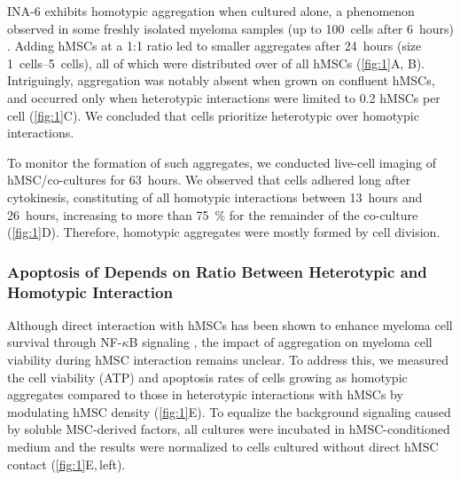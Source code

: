 INA-6 exhibits homotypic aggregation when cultured alone, a phenomenon observed
in some freshly isolated myeloma samples (up to \SI{100}{cells} after
\SI{6}{hours})
\cite{kawanoHomotypicCellAggregations1991,okunoVitroGrowthPattern1991}. Adding
hMSCs at a 1:1 ratio led to smaller aggregates after \SI{24}{hours} (size
\SIrange{1}{5}{cells}), all of which were distributed over
 of all hMSCs (\autoref{fig:1}A, B). Intriguingly,
\INA aggregation was notably absent when grown on confluent hMSCs, and occurred
only when heterotypic interactions were limited to 0.2 hMSCs per \INA cell
(\autoref{fig:1}C). We concluded that \INA cells prioritize heterotypic over
homotypic interactions.

To monitor the formation of such aggregates, we conducted live-cell imaging of
hMSC/\INA co-cultures for \SI{63}{hours}. We observed that \INA cells adhered
long after cytokinesis, constituting  of all
homotypic interactions between \SI{13}{hours} and \SI{26}{hours}, increasing to
more than \SI{75}{\percent} for the remainder of the co-culture
(\autoref{fig:1}D). Therefore, homotypic \INA aggregates were mostly formed by
cell division.

\subsubsection*{Apoptosis of \INA Depends on Ratio Between Heterotypic and Homotypic Interaction}
Although direct interaction with hMSCs has been shown to enhance myeloma cell
survival through NF-$\kappa$B signaling
\cite{hideshimaUnderstandingMultipleMyeloma2007}, the impact of aggregation on
myeloma cell viability during hMSC interaction remains unclear. To address this,
we measured the cell viability (ATP) and apoptosis rates of \INA cells growing
as homotypic aggregates compared to those in heterotypic interactions with hMSCs
by modulating hMSC density (\autoref{fig:1}E). To equalize the background
signaling caused by soluble MSC-derived factors, all cultures were incubated in
hMSC-conditioned medium and the results were normalized to \INA cells cultured
without direct hMSC contact (\autoref{fig:1}E,\,left).




